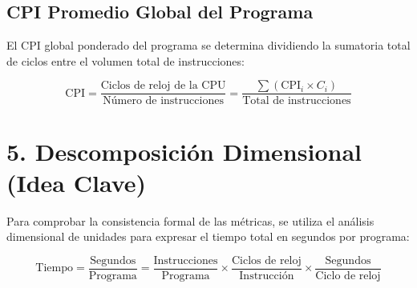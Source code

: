 \documentclass[11pt, letterpaper]{article}
\begin{document}
\subsection*{CPI Promedio Global del Programa}
El CPI global ponderado del programa se determina dividiendo la sumatoria total de ciclos entre el volumen total de instrucciones:
\begin{tcolorbox}
$$\text{CPI} = \frac{\text{Ciclos de reloj de la CPU}}{\text{Número de instrucciones}} = \frac{\sum (\text{CPI}_i \times C_i)}{\text{Total de instrucciones}}$$
\end{tcolorbox}

\section{5. Descomposición Dimensional (Idea Clave)}

Para comprobar la consistencia formal de las métricas, se utiliza el análisis dimensional de unidades para expresar el tiempo total en segundos por programa:

\begin{tcolorbox}[title=Análisis de Unidades del Tiempo de Ejecución]
$$\text{Tiempo} = \frac{\text{Segundos}}{\text{Programa}} = \frac{\text{Instrucciones}}{\text{Programa}} \times \frac{\text{Ciclos de reloj}}{\text{Instrucción}} \times \frac{\text{Segundos}}{\text{Ciclo de reloj}}$$
\end{tcolorbox}
\end{document}
